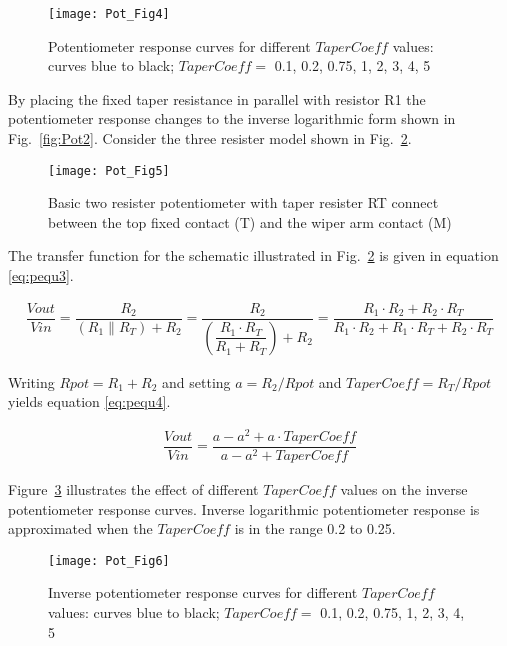 \begin{figure} [h]
  \centering
  \texttt{[image: Pot\_Fig4]}
  \caption{Potentiometer response curves for different $TaperCoeff$ values: curves blue to black; $TaperCoeff =$ 0.1, 0.2, 0.75, 1, 2, 3, 4, 5}
  \label{fig:Pot4}
\end{figure} 


By placing the fixed taper resistance in parallel with resistor R1 the
potentiometer response changes to the inverse logarithmic form shown
in Fig.~\ref{fig:Pot2}. Consider the three resister model shown in
Fig.~\ref{fig:Pot5}.


\begin{figure} [h]
  \centering
  \texttt{[image: Pot\_Fig5]}
  \caption{Basic two resister potentiometer with taper resister RT connect between the top fixed contact (T) and the wiper arm contact (M)}
  \label{fig:Pot5}
\end{figure} 
\medskip 

The transfer function for the schematic illustrated in
Fig.~\ref{fig:Pot5} is given in equation \eqref{eq:pequ3}.

\begin{align}
\label{eq:pequ3}
\dfrac{Vout}{Vin}=\dfrac{R_{2}} { \left( R_{1} \parallel R_{T} \right) + R_{2}}
                 =\dfrac{R_{2}} { \left( \dfrac{ R_{1} \cdot R_{T} } {R_{1} + R_{T} } \right)  + R_{2}  } 
                 =\dfrac{R_{1} \cdot R_{2} + R_{2} \cdot R_{T}}{R_{1} \cdot R_{2}+ R_{1} \cdot R_{T} + R_{2} \cdot R_{T}}
\end{align}  

Writing $Rpot=R_{1}+R_{2}$ and setting $a=R_{2}/Rpot$ and
$TaperCoeff=R_{T}/Rpot$ yields equation \eqref{eq:pequ4}.

\begin{align}
\label{eq:pequ4}
\dfrac{Vout}{Vin}=\dfrac{a - a^{2} + a\cdot TaperCoeff }{a - a^{2} + TaperCoeff}
\end{align}  

Figure~\ref{fig:Pot6} illustrates the effect of different $TaperCoeff$
values on the inverse potentiometer response curves.  Inverse
logarithmic potentiometer response is approximated when the
$TaperCoeff$ is in the range 0.2 to 0.25.


\begin{figure} [h] 
  \centering
  \texttt{[image: Pot\_Fig6]}
  \caption{Inverse potentiometer response curves for different $TaperCoeff$ values: curves blue to black; $TaperCoeff =$ 0.1, 0.2, 0.75, 1, 2, 3, 4, 5}
  \label{fig:Pot6}
\end{figure} 



